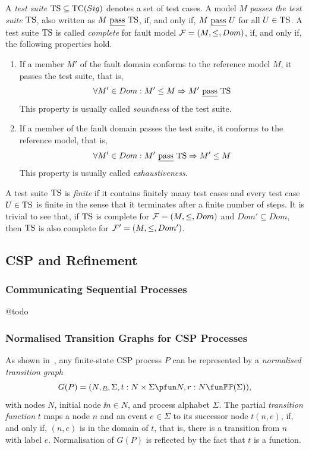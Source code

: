 A \emph{test suite} ${\text{TS}} \subseteq {\text{TC}}(Sig)$ denotes  a set of test cases. A
model $M$ \emph{passes the test suite} ${\text{TS}}$, also written as $M\ \underline{\text{pass}}\
{\text{TS}}$, if, and only if, $M\ \pass\ U$ for all $U\in {\text{TS}}$. A test suite ${\text{TS}}$
is called \emph{complete} for fault model ${\cal F} = (M,\le,Dom)$, if, and
only if, the following properties hold.
\begin{enumerate}
\item If a member $M'$ of the fault domain  conforms to the reference model $M$,
it passes the test suite, that is,
$$
\forall M'\in Dom: M'\le M \Rightarrow M'\ \underline{\text{pass}}\ {\text{TS}}
$$
This property is usually called \emph{soundness} of the test suite.

\item If a member of the fault domain passes the test suite, it conforms to the reference model, that is,
$$
\forall M'\in Dom: M'\ \underline{\text{pass}}\ {\text{TS}} \Rightarrow M'\le M
$$
This property is usually called \emph{exhaustiveness}.
\end{enumerate}
A test suite ${\text{TS}}$ is \emph{finite} if it contains finitely many test cases and every test
case $U\in{\text{TS}}$ is finite in the sense that it terminates after a finite number of steps.
It is trivial to see that, if ${\text{TS}}$ is complete  for   ${\cal F} = (M,\le,Dom)$
and $Dom'\subseteq Dom$, then ${\text{TS}}$ is also complete for ${\cal F}' = (M,\le,Dom')$.

 
\subsection{CSP and Refinement}


\subsubsection*{Communicating Sequential Processes} @todo

\subsubsection*{Normalised Transition Graphs for CSP Processes}
\label{sec:ntg}

As shown in~\cite{Roscoe:1994:CME:197600}, any finite-state CSP process $P$
can be represented by a \emph{normalised transition graph}
$$
G(P) = ( N, \ii n, \Sigma, t : N\times\Sigma \pfun N, r : N \fun \mathbb{P}\mathbb{P}(\Sigma)),
$$
with nodes $N$, initial node $\ii n\in N$, and process alphabet $\Sigma$. The
partial \emph{transition function} $t$ maps a node $n$ and an event
$e\in\Sigma$ to its successor node $t(n,e)$, if, and only if, $(n,e)$ is in
the domain of $t$, that is, there is a transition from $n$ with label $e$.
Normalisation of $G(P)$ is reflected by the fact that $t$ is a function.


